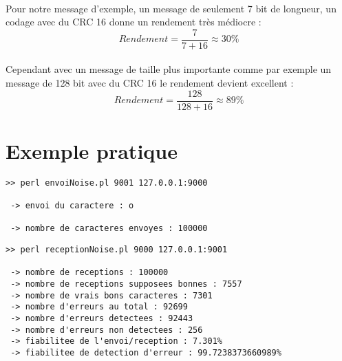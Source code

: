         \paragraph{}
Pour notre message d'exemple, un message de seulement 7 bit de longueur, un codage avec du CRC 16 donne un rendement très médiocre :
\[  Rendement = \frac{7}{7 + 16} \approx 30\%  \]
        \paragraph{}
Cependant avec un message de taille plus importante comme par exemple un message de 128 bit avec du CRC 16 le rendement devient excellent :
\[  Rendement = \frac{128}{128 + 16} \approx 89\%  \]


    \section{Exemple pratique}
           \lstset{
                language=bash, basicstyle=\ttfamily\small, columns=flexible,
                tabsize=2, extendedchars=true, showspaces=false,
                showstringspaces=false, numbers=left, numberstyle=\tiny,
                breaklines=true, breakautoindent=true, captionpos=b
            }

    \begin{lstlisting}
>> perl envoiNoise.pl 9001 127.0.0.1:9000

 -> envoi du caractere : o

 -> nombre de caracteres envoyes : 100000

    \end{lstlisting}

    \begin{lstlisting}
>> perl receptionNoise.pl 9000 127.0.0.1:9001

 -> nombre de receptions : 100000
 -> nombre de receptions supposees bonnes : 7557
 -> nombre de vrais bons caracteres : 7301
 -> nombre d'erreurs au total : 92699
 -> nombre d'erreurs detectees : 92443
 -> nombre d'erreurs non detectees : 256
 -> fiabilitee de l'envoi/reception : 7.301%
 -> fiabilitee de detection d'erreur : 99.7238373660989%

    \end{lstlisting}
